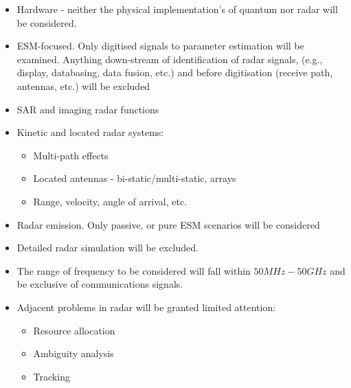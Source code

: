\begin{itemize}
    \item Hardware - neither the physical implementation's of quantum nor radar will be considered.
    \item \ac{ESM}-focused. Only digitised signals to parameter estimation will be examined. Anything down-stream of identification of radar signals, (e.g., display, databasing, data fusion, etc.) and before digitisation (receive path, antennas, etc.) will be excluded
    \item \ac{SAR} and imaging radar functions
    \item Kinetic and located radar systems:
    \begin{itemize}
        \item Multi-path effects
        \item Located antennas - bi-static/multi-static, arrays
        \item Range, velocity, angle of arrival, etc.
    \end{itemize}
    \item Radar emission. Only passive, or pure \ac{ESM} scenarios will be considered
    \item Detailed radar simulation will be excluded.
    \item The range of frequency to be considered will fall within \(50MHz - 50GHz\) and be exclusive of communications signals.
    \item Adjacent problems in radar will be granted limited attention:
    \begin{itemize}
        \item Resource allocation
        \item Ambiguity analysis
        \item Tracking
    \end{itemize}
\end{itemize}

